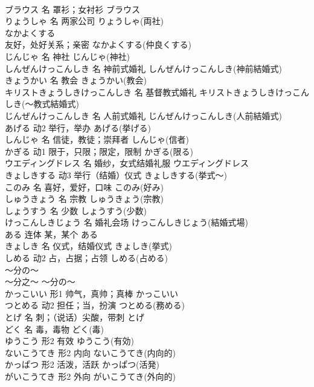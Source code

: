 \documentclass[8pt]{extreport}
\begin{document}
\begin{CJK}{UTF8}{min}
\\	ブラウス	名	罩衫；女衬衫	ブラウス	
\\	りょうしゃ	名	两家公司	りょうしゃ(両社)	
\\	なかよくする	
\\	友好，处好关系；亲密	なかよくする(仲良くする)	
\\	じんじゃ	名	神社	じんじゃ(神社)	
\\	しんぜんけっこんしき	名	神前式婚礼	しんぜんけっこんしき(神前結婚式)	
\\	きょうかい	名	教会	きょうかい(教会)	
\\	キリストきょうしきけっこんしき	名	基督教式婚礼	キリストきょうしきけっこんしき(～教式結婚式)	
\\	じんぜんけっこんしき	名	人前式婚礼	じんぜんけっこんしき(人前結婚式)	
\\	あげる	动2	举行，举办	あげる(挙げる)	
\\	しんじゃ	名	信徒，教徒；崇拜者	しんじゃ(信者)	
\\	かぎる	动1	限于，只限；限定，限制	かぎる(限る)	
\\	ウエディングドレス	名	婚纱，女式结婚礼服	ウエディングドレス	
\\	きょしきする	动3	举行（结婚）仪式	きょしきする(挙式～)	
\\	このみ	名	喜好，爱好，口味	このみ(好み)	
\\	しゅうきょう	名	宗教	しゅうきょう(宗教)	
\\	しょうすう	名	少数	しょうすう(少数)	
\\	けっこんしきじょう	名	婚礼会场	けっこんしきじょう(結婚式場)	
\\	ある	连体	某，某个	ある	
\\	きょしき	名	仪式，结婚仪式	きょしき(挙式)	
\\	しめる	动2	占，占据；占领	しめる(占める)	
\\	～分の～	
\\	～分之～	～分の～	
\\	かっこいい	形1	帅气，真帅；真棒	かっこいい	
\\	つとめる	动2	担任；当，扮演	つとめる(務める)	
\\	とげ	名	刺；（说话）尖酸，带刺	とげ	
\\	どく	名	毒，毒物	どく(毒)	
\\	ゆうこう	形2	有效	ゆうこう(有効)	
\\	ないこうてき	形2	内向	ないこうてき(内向的)	
\\	かっぱつ	形2	活泼，活跃	かっぱつ(活発)	
\\	がいこうてき	形2	外向	がいこうてき(外向的)	

\end{CJK}
\end{document}
